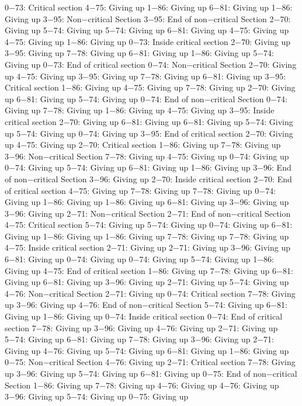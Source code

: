 0−73: Critical section
4−75: Giving up
1−86: Giving up
6−81: Giving up
1−86: Giving up
3−95: Non−critical Section
3−95: End of non−critical Section
2−70: Giving up
5−74: Giving up
5−74: Giving up
6−81: Giving up
4−75: Giving up
4−75: Giving up
1−86: Giving up
0−73: Inside critical section
2−70: Giving up
3−95: Giving up
7−78: Giving up
6−81: Giving up
1−86: Giving up
5−74: Giving up
0−73: End of critical section
0−74: Non−critical Section
2−70: Giving up
4−75: Giving up
3−95: Giving up
7−78: Giving up
6−81: Giving up
3−95: Critical section
1−86: Giving up
4−75: Giving up
7−78: Giving up
2−70: Giving up
6−81: Giving up
5−74: Giving up
0−74: End of non−critical Section
0−74: Giving up
7−78: Giving up
1−86: Giving up
4−75: Giving up
3−95: Inside critical section
2−70: Giving up
6−81: Giving up
6−81: Giving up
5−74: Giving up
5−74: Giving up
0−74: Giving up
3−95: End of critical section
2−70: Giving up
4−75: Giving up
2−70: Critical section
1−86: Giving up
7−78: Giving up
3−96: Non−critical Section
7−78: Giving up
4−75: Giving up
0−74: Giving up
0−74: Giving up
5−74: Giving up
6−81: Giving up
1−86: Giving up
3−96: End of non−critical Section
3−96: Giving up
2−70: Inside critical section
2−70: End of critical section
4−75: Giving up
7−78: Giving up
7−78: Giving up
0−74: Giving up
1−86: Giving up
1−86: Giving up
6−81: Giving up
3−96: Giving up
3−96: Giving up
2−71: Non−critical Section
2−71: End of non−critical Section
4−75: Critical section
5−74: Giving up
5−74: Giving up
0−74: Giving up
6−81: Giving up
1−86: Giving up
1−86: Giving up
7−78: Giving up
7−78: Giving up
4−75: Inside critical section
2−71: Giving up
2−71: Giving up
3−96: Giving up
6−81: Giving up
0−74: Giving up
0−74: Giving up
5−74: Giving up
1−86: Giving up
4−75: End of critical section
1−86: Giving up
7−78: Giving up
6−81: Giving up
6−81: Giving up
3−96: Giving up
2−71: Giving up
5−74: Giving up
4−76: Non−critical Section
2−71: Giving up
0−74: Critical section
7−78: Giving up
3−96: Giving up
4−76: End of non−critical Section
5−74: Giving up
6−81: Giving up
1−86: Giving up
0−74: Inside critical section
0−74: End of critical section
7−78: Giving up
3−96: Giving up
4−76: Giving up
2−71: Giving up
5−74: Giving up
6−81: Giving up
7−78: Giving up
3−96: Giving up
2−71: Giving up
4−76: Giving up
5−74: Giving up
6−81: Giving up
1−86: Giving up
0−75: Non−critical Section
4−76: Giving up
2−71: Critical section
7−78: Giving up
3−96: Giving up
5−74: Giving up
6−81: Giving up
0−75: End of non−critical Section
1−86: Giving up
7−78: Giving up
4−76: Giving up
4−76: Giving up
3−96: Giving up
5−74: Giving up
0−75: Giving up
